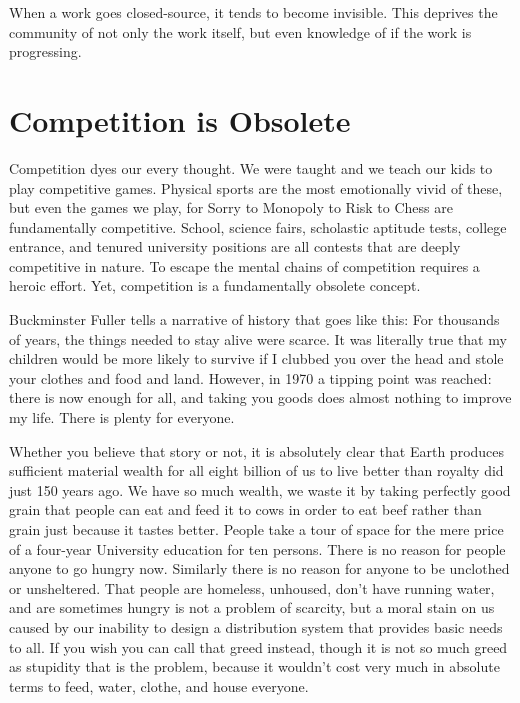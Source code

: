 \documentclass[
	fontsize=10pt, %
	twoside=false, %
	secnumdepth=1, %
]{kaobook}
\begin{document}
When a work goes closed-source, it tends
to become invisible.
This deprives the community of not
only the work itself, but even knowledge of if the work is
progressing.

\section{Competition is Obsolete}

Competition dyes our every thought.
We were taught and we teach our kids to
play competitive games. Physical sports
are the most emotionally vivid of these,
but even the games we play, for Sorry to
Monopoly to Risk to Chess are fundamentally
competitive.
School, science fairs, scholastic aptitude tests,
college entrance, and tenured university positions are
all contests that are deeply competitive in nature.
To escape the mental chains of competition
requires a heroic effort. Yet, competition is
a fundamentally obsolete concept.

Buckminster Fuller tells a narrative of history that
goes like this: For thousands of years, the things
needed to stay alive were scarce. It was literally
true that my children would be more likely to survive
if I clubbed you over the head and stole your clothes
and food and land. However, in 1970 a tipping point
was reached: there is now enough for all, and taking
you goods does almost nothing to improve my life.
There is plenty for everyone.

Whether you believe that story or not, it is absolutely
clear that Earth produces sufficient material wealth
for all eight billion of us to live better than royalty
did just 150 years ago. We have so much wealth, we
waste it by taking perfectly good grain that people
can eat and feed it to cows in order to eat beef
rather than grain just because it tastes better.
People take a tour of space for the mere price
of a four-year University education for ten persons.
There is no reason for people anyone to go hungry now.
Similarly there is no reason for anyone to be unclothed
or unsheltered. That people are homeless, unhoused,
don't have running water, and are sometimes hungry
is not a problem of scarcity, but a moral stain
on us caused by our inability to design a distribution
system that provides basic needs to all. If you wish
you can call that greed instead, though it is not
so much greed as stupidity that is the problem, because
it wouldn't cost very much in absolute terms to feed, water,
clothe, and house everyone.
\end{document}
